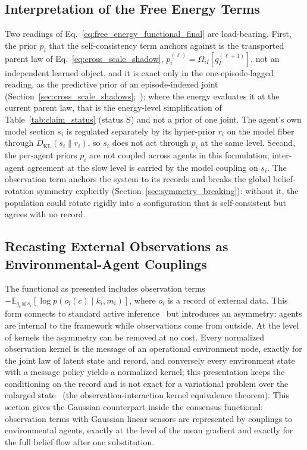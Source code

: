 \documentclass[11pt]{article}
\begin{document}
\subsection{Interpretation of the Free Energy Terms}

Two readings of Eq.~\eqref{eq:free_energy_functional_final} are load-bearing. First, the prior $p_i$ that the self-consistency term anchors against is the transported parent law of Eq.~\eqref{eq:cross_scale_shadow}, $p_i^{(\ell)} = \Omega_{iI}[q_I^{(\ell+1)}]$, not an independent learned object, and it is exact only in the one-episode-lagged reading, as the predictive prior of an episode-indexed joint (Section~\ref{sec:cross_scale_shadows};~\cite[Ch.~12]{DennisGaugeVFE2026}); where the energy evaluates it at the current parent law, that is the energy-level simplification of Table~\ref{tab:claim_status} (status S) and not a prior of one joint. The agent's own model section $s_i$ is regulated separately by its hyper-prior $r_i$ on the model fiber through $D_{\mathrm{KL}}(s_i\|r_i)$, so $s_i$ does not act through $p_i$ at the same level. Second, the per-agent priors $p_i$ are not coupled across agents in this formulation; inter-agent agreement at the slow level is carried by the model coupling on $s_i$. The observation term anchors the system to its records and breaks the global belief-rotation symmetry explicitly (Section~\ref{sec:symmetry_breaking}): without it, the population could rotate rigidly into a configuration that is self-consistent but agrees with no record.

\subsection{Recasting External Observations as Environmental-Agent Couplings}

The functional as presented includes observation terms $-\mathbb{E}_{q_i\otimes s_i}[\log p(o_i(c)\mid k_i,m_i)]$, where $o_i$ is a record of external data. This form connects to standard active inference~\cite{Friston2010, parr2022active} but introduces an asymmetry: agents are internal to the framework while observations come from outside. At the level of kernels the asymmetry can be removed at no cost. Every normalized observation kernel is the message of an operational environment node, exactly for the joint law of latent state and record, and conversely every environment state with a message policy yields a normalized kernel; this presentation keeps the conditioning on the record and is not exact for a variational problem over the enlarged state~\cite[Ch.~5]{DennisGaugeVFE2026} (the observation-interaction kernel equivalence theorem). This section gives the Gaussian counterpart inside the consensus functional: observation terms with Gaussian linear sensors are represented by couplings to environmental agents, exactly at the level of the mean gradient and exactly for the full belief flow after one substitution.
\end{document}
